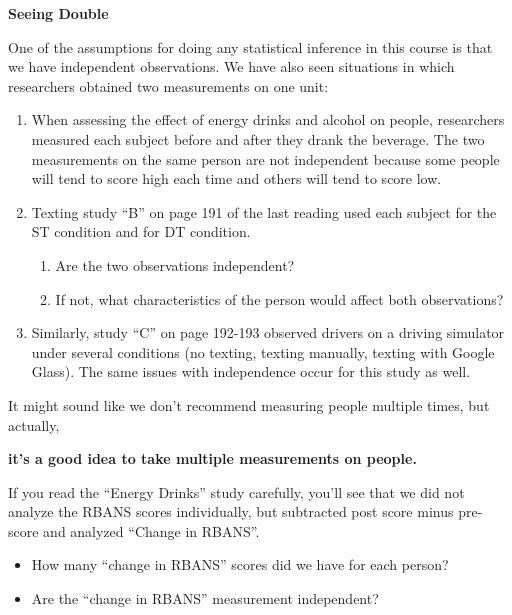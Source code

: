 \def\theTopic{Paired Intro }

\begin{center}
{\bf {\large Seeing Double}}\\ 
\end{center}

One of the assumptions for doing any statistical inference in this
course is that we have independent observations.  
We have also seen situations in which researchers obtained two
measurements on one unit:
\begin{enumerate}
  \item  When assessing the effect of energy drinks and alcohol on
    people, researchers measured each subject before and after they
    drank the beverage.  The two measurements on the same person are
    not independent because some people will tend to score high each
    time and others will tend to score low.
  \item Texting study ``B'' on page 191 of the last reading used each
    subject for the ST  condition and for DT condition.  
    \begin{enumerate}
    \item Are the two  observations independent?\vspace{1cm}
    \item If not, what characteristics of the person would affect both
      observations? \vspace{1cm}
    \end{enumerate}
  \item Similarly, study ``C'' on page 192-193 observed drivers on a
    driving simulator under several conditions (no texting, texting
    manually, texting with Google Glass).  The same issues with
    independence occur for this study as well.
  \end{enumerate}

It might sound like we don't recommend measuring people multiple
times, but actually, \vspace{.4cm}

{\bf it's a good idea to take multiple measurements on people.}\vspace{.4cm}
  

If you read the ``Energy Drinks'' study carefully, you'll see that we
did not analyze the RBANS scores individually, but subtracted post
score minus pre-score and analyzed ``Change in RBANS''.
\begin{itemize}
\item How many ``change in RBANS'' scores did we have for each
  person?\vspace{.5cm}
\item Are the ``change in RBANS'' measurement independent?\vspace{.5cm}
\end{itemize}

